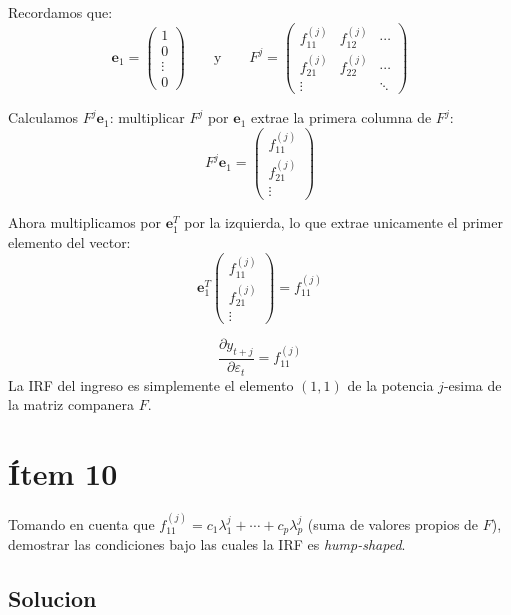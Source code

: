Recordamos que:
\[
    \mathbf{e}_1 = \begin{pmatrix} 1 \\ 0 \\ \vdots \\ 0 \end{pmatrix}
    \qquad \text{y} \qquad
    F^j = \begin{pmatrix} f_{11}^{(j)} & f_{12}^{(j)} & \cdots \\ f_{21}^{(j)} & f_{22}^{(j)} & \cdots \\ \vdots & & \ddots \end{pmatrix}
\]

Calculamos $F^j \mathbf{e}_1$: multiplicar $F^j$ por $\mathbf{e}_1$ extrae la primera columna de $F^j$:
\[
    F^j \mathbf{e}_1 = \begin{pmatrix} f_{11}^{(j)} \\ f_{21}^{(j)} \\ \vdots \end{pmatrix}
\]

Ahora multiplicamos por $\mathbf{e}_1^T$ por la izquierda, lo que extrae unicamente el primer elemento del vector:
\[
    \mathbf{e}_1^T \begin{pmatrix} f_{11}^{(j)} \\ f_{21}^{(j)} \\ \vdots \end{pmatrix}
    = f_{11}^{(j)}
\]

\begin{resultado}
\[
    \frac{\partial y_{t+j}}{\partial \varepsilon_t} = f_{11}^{(j)}
\]
La IRF del ingreso es simplemente el elemento $(1,1)$ de la potencia $j$-esima de la matriz companera $F$.
\end{resultado}

\section*{Ítem 10}

\begin{enunciado}
Tomando en cuenta que $f_{11}^{(j)} = c_1\lambda_1^j + \cdots + c_p\lambda_p^j$ (suma de valores propios de $F$), demostrar las condiciones bajo las cuales la IRF es \textit{hump-shaped}.
\end{enunciado}

\subsection*{Solucion}


